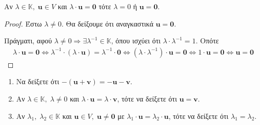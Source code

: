 \begin{prop}
\item {}
    Αν $ \lambda \in \mathbb{K}, \; \mathbf{u} \in V $ και $ \lambda \cdot \mathbf{u} =
    \mathbf{0} $ τότε $ \lambda = 0 $ ή $ \mathbf{u} = \mathbf{0} $. 
\end{prop}

\begin{proof}
\item {}
    Έστω $ \lambda \neq 0 $. Θα δείξουμε ότι αναγκαστικά $ \mathbf{u} = \mathbf{0} $. 

    Πράγματι, αφού $ \lambda \neq 0 \Rightarrow \exists \lambda ^{-1} \in \mathbb{K} $, 
    όπου ισχύει ότι $ \lambda \cdot \lambda ^{-1} = 1 $. Οπότε 
    \begin{gather*}
        \lambda \cdot \mathbf{u} = \mathbf{0} \Leftrightarrow 
        \lambda ^{-1}\cdot (\lambda \cdot \mathbf{u}) = \lambda ^{-1} \cdot \mathbf{0}
        \Leftrightarrow 
        (\lambda \cdot \lambda ^{-1}) \cdot \mathbf{u} = \mathbf{0} \Leftrightarrow 
        1 \cdot \mathbf{u} = \mathbf{0} \Leftrightarrow 
        \mathbf{u} = \mathbf{0} 
     \end{gather*} 
\end{proof}

\begin{exercises}
\item {}
    \begin{enumerate}
        \item Να δείξετε ότι $ - ( \mathbf{u}+ \mathbf{v} ) = - \mathbf{u} - 
            \mathbf{v} $.
        \item Αν $ \lambda \in \mathbb{K}, \; \lambda \neq 0 $ και 
            $ \lambda \cdot \mathbf{u}= \lambda \cdot \mathbf{v}$, τότε να 
            δείξετε ότι $ \mathbf{u} = \mathbf{v} $.
        \item Αν $ \lambda_{1}, \; \lambda _{2} \in \mathbb{K} $ και 
            $ \mathbf{u} \in V, \; \mathbf{u} \neq \mathbf{0} $ με 
            $ \lambda _{1}\cdot \mathbf{u} = \lambda _{2} \cdot \mathbf{u}$, 
            τότε να δείξετε ότι $ \lambda _{1} = \lambda _{2} $.
    \end{enumerate}
\end{exercises}




